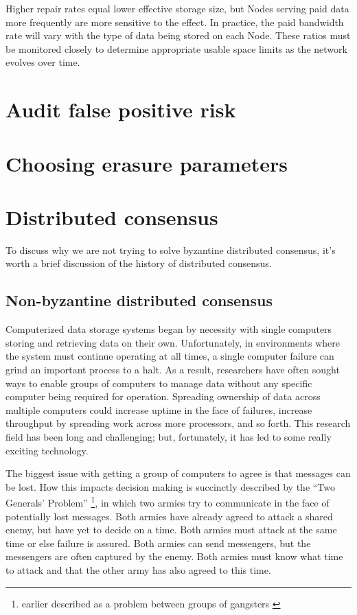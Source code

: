 \documentclass[8pt,fleqn,openany]{book}
\begin{document}
Higher repair rates equal lower effective storage size, but Nodes serving paid
data more frequently are more sensitive to the effect.
In practice, the paid bandwidth rate will vary with the type of data being
stored on each Node.
These ratios must be monitored closely to determine appropriate usable space
limits as the network evolves over time.

\chapter{Audit false positive risk}\label{appendix:audit-false-positive}



\chapter{Choosing erasure parameters}
\label{appendix:RS}





\chapter{Distributed consensus}\label{chap:dist-consensus}

To discuss why we are not trying to solve byzantine distributed consensus,
it's worth a brief discussion of the history of distributed consensus.

\section{Non-byzantine distributed consensus}

Computerized data storage systems began by necessity with single computers
storing and retrieving data on their own. Unfortunately, in environments where
the system must continue operating at all times, a single computer failure can
grind an important process to a halt. As a result, researchers have often
sought ways to enable groups of computers to manage data
without any specific computer being required for operation. Spreading ownership
of data across multiple computers could increase uptime in the face of failures,
increase throughput by spreading work across more processors, and so forth.
This research field has been long and challenging; but, fortunately, it has led
to some really exciting technology.

The biggest issue with getting a group of computers to agree is that messages
can be lost. How this impacts decision making is succinctly described by the
``Two Generals' Problem'' \cite{two-generals}
\footnote{earlier described as a problem
between groups of gangsters \cite{two-gangsters}}, in which two armies try to
communicate in the face of potentially lost messages. Both armies have already
agreed to attack a shared enemy, but have yet to decide on a time. Both armies
must attack at the same time or else failure is assured. Both armies can send
messengers, but the messengers are often captured by the enemy. Both armies must
know what time to attack and that the other army has also agreed to this time.
\end{document}
